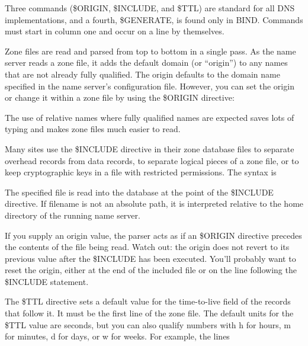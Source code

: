 \protect\hypertarget{part0024_split_020.htmlux5cux23_idTextAnchor867}{}{}Three
commands ({\$ORIGIN}, {\$INCLUDE}, and {\$TTL}) are standard for all DNS
implementations, and a fourth, {\$GENERATE}, is found only in BIND.
Commands must start in column one and occur on a line by themselves.

Zone files are read and parsed from top to bottom in a single pass. As
the name server reads a zone file, it adds the default domain (or
``origin'') to any names that are not already fully qualified. The
origin defaults to the domain name specified in the name server's
configuration file. However, you can set the origin or change it within
a zone file by using
the\protect\hypertarget{part0024_split_020.htmlux5cux23_idIndexMarker2060}{}{}
{\$ORIGIN} directive:


The use of relative names where fully qualified names are expected saves
lots of typing and makes zone files much easier to read.

Many sites use the {\$INCLUDE} directive in their zone database files to
separate overhead records from data records, to separate logical pieces
of a zone file, or to keep cryptographic keys in a file with restricted
permissions. The syntax is


The specified file is read into the database at the point of the
\protect\hypertarget{part0024_split_020.htmlux5cux23_idIndexMarker2061}{}{}{\$INCLUDE}
directive. If {filename} is not an absolute path, it is interpreted
relative to the home directory of the running name server.

If you supply an {origin} value, the parser acts as if an {\$ORIGIN}
directive precedes the contents of the file being read. Watch out: the
origin does not revert to its previous value after the {\$INCLUDE} has
been executed. You'll probably want to reset the origin, either at the
end of the included file or on the line following the {\$INCLUDE}
statement.

\protect\hypertarget{part0024_split_020.htmlux5cux23_idTextAnchor868}{}{}The
\protect\hypertarget{part0024_split_020.htmlux5cux23_idIndexMarker2062}{}{}{\$TTL}
directive sets a default value for the time-to-live field of the records
that follow it. It must be the first line of the zone file. The default
units for the {\$TTL} value are seconds, but you can also qualify
numbers with {h} for hours, {m} for minutes, {d} for days, or {w} for
weeks. For example, the lines


